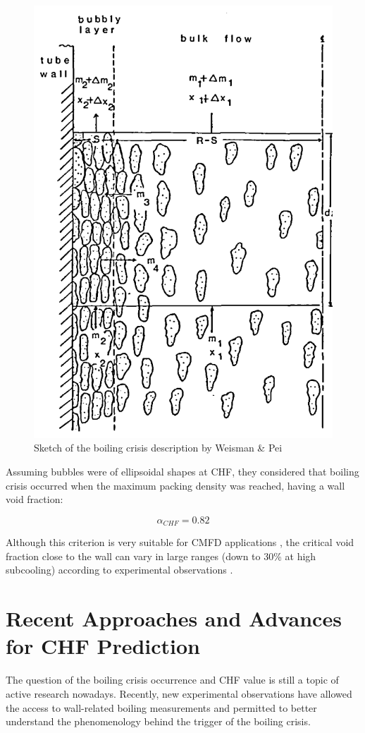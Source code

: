 \begin{figure}[!h]
\centering
\includegraphics[width=0.4\linewidth]{img/chf/chf_weisman.png}
\caption{Sketch of the boiling crisis description by Weisman \& Pei}
\label{fig:chf_weisman}
\end{figure}

\npar

Assuming bubbles were of ellipsoidal shapes at CHF, they considered that boiling crisis occurred when the maximum packing density was reached, \ie having a wall void fraction:

\begin{equation}
\alpha_{CHF} = 0.82
\end{equation} 

Although this criterion is very suitable for CMFD applications \cite{mimouni_computational_2016, liu_critical_2021}, the critical void fraction close to the wall can vary in large ranges (down to 30\% at high subcooling) according to experimental observations \cite{bruder_empirical_2018}.


\section{Recent Approaches and Advances for CHF Prediction}



The question of the boiling crisis occurrence and CHF value is still a topic of active research nowadays. Recently, new experimental observations have allowed the access to wall-related boiling measurements \cite{kossolapov_experimental_2021, richenderfer_experimental_2018, bloch_study_2016} and permitted to better understand the phenomenology behind the trigger of the boiling crisis.

\npar

